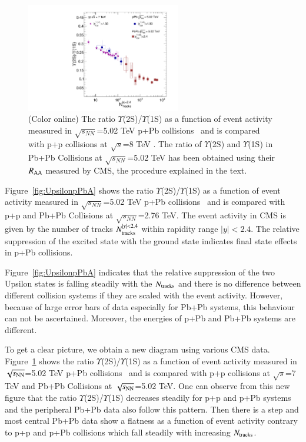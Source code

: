 \begin{figure}
  \begin{center}
    \includegraphics[width=0.60\textwidth]{Figures/Fig15_LHC_Y2SByY1S_NTrk.pdf}
\caption{(Color online)
 The ratio $\Upsilon$(2S)/$\Upsilon$(1S) as a function of event activity measured in 
$\sqrt{s_{NN}}$=5.02 TeV p+Pb collisions~\cite{CMS:2013jsu} and is compared with p+p
collisions at $\sqrt{s}$=8 TeV \cite{CMS:2020fae}.
The ratio of $\Upsilon$(2S) and $\Upsilon$(1S) in Pb+Pb Collisions at
$\sqrt{s_{NN}}$=5.02 TeV has been obtained using their $R_{\rm AA}$ measured by CMS, 
the procedure explained in the text.
}
\label{fig:UpsilonpPb}
\end{center}
\end{figure}



Figure~\ref{fig:UpsilonpPbA} shows
the ratio $\Upsilon$(2S)/$\Upsilon$(1S) as a function of event activity measured in 
$\sqrt{s_{NN}}$=5.02 TeV p+Pb collisions~\cite{CMS:2013jsu} and is compared with p+p
and Pb+Pb Collisions at $\sqrt{s_{NN}}$=2.76 TeV.
The event activity in CMS is given by the number of tracks $N_{\rm tracks}^{|y|<2.4}$ within rapidity
range $|y|<2.4$. The relative suppression of the excited state with the ground state indicates final
state effects in p+Pb collisions. 

Figure~\ref{fig:UpsilonpPbA} indicates that the relative suppression of
the two Upsilon states is falling steadily with the $N_{\rm tracks}$ and
there is no difference between different collision systems if
they are scaled with the event activity. However, because of large error bars
of data especially for Pb+Pb systems, this behaviour can not be ascertained.
Moreover, the energies of p+Pb and Pb+Pb systems are different.

To get a clear picture, we obtain a new diagram using various CMS data.
Figure~\ref{fig:UpsilonpPb} shows the ratio $\Upsilon$(2S)/$\Upsilon$(1S) as a function of
event activity measured in $\sqrt{s_{\rm NN}}$=5.02 TeV p+Pb collisions~\cite{CMS:2013jsu}
and is compared with p+p collisions at $\sqrt{s}$=7 TeV \cite{CMS:2020fae} and
Pb+Pb Collisions at $\sqrt{s_{\rm NN}}$=5.02 TeV. One can observe from this new figure
that the ratio $\Upsilon$(2S)/$\Upsilon$(1S) decreases steadily for p+p and p+Pb systems
and the peripheral Pb+Pb data also follow this pattern. Then there is a step and most central Pb+Pb
data show a flatness as a function of event activity contrary to p+p and
p+Pb collisions which fall steadily with increasing $N_{\rm tracks}$.

